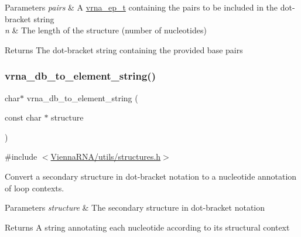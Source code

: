 \begin{DoxyParams}{Parameters}
{\em pairs} & A \mbox{\hyperlink{group__struct__utils__plist_gab9ac98ab55ded9fb90043b024b915aca}{vrna\+\_\+ep\+\_\+t}} containing the pairs to be included in the dot-\/bracket string \\
\hline
{\em n} & The length of the structure (number of nucleotides) \\
\hline
\end{DoxyParams}
\begin{DoxyReturn}{Returns}
The dot-\/bracket string containing the provided base pairs 
\end{DoxyReturn}
\mbox{\label{group__struct__utils__dot__bracket_ga45360c09fb6d04d96e42dcccbb66015b}} 
\subsubsection{\texorpdfstring{vrna\_db\_to\_element\_string()}{vrna\_db\_to\_element\_string()}}
{\footnotesize\ttfamily char$\ast$ vrna\+\_\+db\+\_\+to\+\_\+element\+\_\+string (\begin{DoxyParamCaption}\item[{const char $\ast$}]{structure }\end{DoxyParamCaption})}



{\ttfamily \#include $<$\mbox{\hyperlink{utils_2structures_8h}{Vienna\+R\+N\+A/utils/structures.\+h}}$>$}



Convert a secondary structure in dot-\/bracket notation to a nucleotide annotation of loop contexts. 


\begin{DoxyParams}{Parameters}
{\em structure} & The secondary structure in dot-\/bracket notation \\
\hline
\end{DoxyParams}
\begin{DoxyReturn}{Returns}
A string annotating each nucleotide according to it\textquotesingle{}s structural context 
\end{DoxyReturn}
\mbox{\label{group__struct__utils__dot__bracket_ga97dbebaa3fc49524cf5afa338a6c52ee}} 
